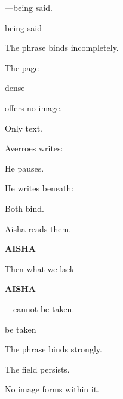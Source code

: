 ---being said.

\medskip

 being said

\medskip

The phrase binds incompletely.

\medskip

The page---

\medskip

dense---

\medskip

offers no image.

\medskip

Only text.

\medskip


\medskip

Averroes writes:

\medskip


\medskip

He pauses.

\medskip

He writes beneath:

\medskip


\medskip

Both bind.

\medskip

Aisha reads them.

\medskip

\textbf{AISHA}

Then what we lack---

\medskip

\textbf{AISHA}

---cannot be taken.

\medskip

 be taken

\medskip

The phrase binds strongly.

\medskip

The field persists.

\medskip

No image forms within it.

\medskip

